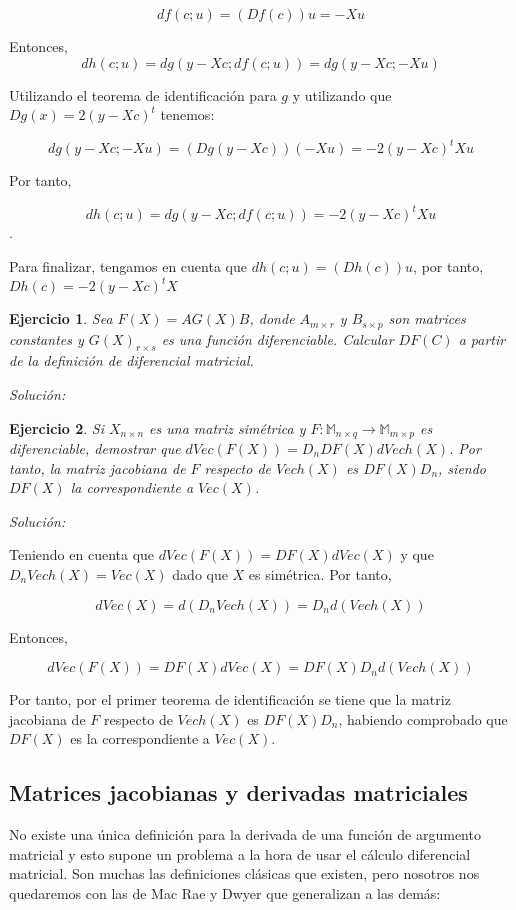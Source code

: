 \documentclass{article}
\theoremstyle{theorem-style}  %
\theoremstyle{definition-style}
\theoremstyle{example-style}
\theoremstyle{exercise-style}
\newtheorem{exercise}{Ejercicio}[section]
\begin{document}
	$$ df(c;u) = (Df(c))u = -X u$$
	
	Entonces,
	$$  dh(c;u) = dg(y - Xc; df(c;u)) = dg( y -Xc; -Xu)$$
	
	
	Utilizando el teorema de identificación para $g$ y utilizando que $Dg(x) = 2(y- Xc)^t$  tenemos:
	
	$$ dg(y - Xc ; -Xu) = (Dg(y - Xc))(-Xu) =  -2 (y - Xc)^t Xu$$
	
	Por tanto,
	
	$$ dh(c;u) = dg(y - Xc; df(c;u)) = -2(y - Xc)^tXu$$.
	
	Para finalizar, tengamos en cuenta que $dh(c;u) = (Dh(c))u$, por tanto, $Dh(c) = -2(y - Xc)^tX$
	
	\begin{exercise}
		Sea $F(X)=AG(X)B$, donde $A_{m\times r}$ y $B_{s\times p}$ son matrices constantes y $G(X)_{r\times s}$ es una función diferenciable. Calcular $DF(C)$ a partir de la definición de diferencial matricial.
	\end{exercise}
	\textit{Solución:}
	
	\begin{exercise}
		Si $X_{n\times n}$ es una matriz simétrica y $F: \mathbb{M}_{n\times q} \rightarrow \mathbb{M}_{m\times p}$ es diferenciable, demostrar que $dVec(F(X)) = D_nDF(X)dVech(X)$. Por tanto, la matriz jacobiana de $F$ respecto de $Vech(X)$ es $DF(X)D_n$, siendo $DF(X)$ la correspondiente a $Vec(X)$.
		
	\end{exercise}
	\textit{Solución:}
	
	Teniendo en cuenta que $dVec(F(X)) = DF(X) dVec(X)$ y que $D_n Vech(X) = Vec(X)$ dado que $X$ es simétrica. Por tanto,
	
	$$ dVec(X) = d(D_n Vech(X)) = D_n d(Vech(X))$$
	
	Entonces,
	
	$$d Vec (F(X)) = DF(X) d Vec(X) = DF(X)D_n d(Vech(X))$$
	
	Por tanto, por el primer teorema de identificación se tiene que la matriz jacobiana de $F$ respecto de $Vech(X)$ es $DF(X)D_n$,  habiendo comprobado que $DF(X)$ es la correspondiente a $Vec(X)$. 
	
	
	\subsection{Matrices jacobianas y derivadas matriciales}
	
	No existe una única definición para la derivada de una función de argumento matricial y esto supone un problema a la hora de usar el cálculo diferencial matricial. Son muchas las definiciones clásicas que existen, pero nosotros nos quedaremos con las de Mac Rae y Dwyer que generalizan a las demás:
	
\end{document}
